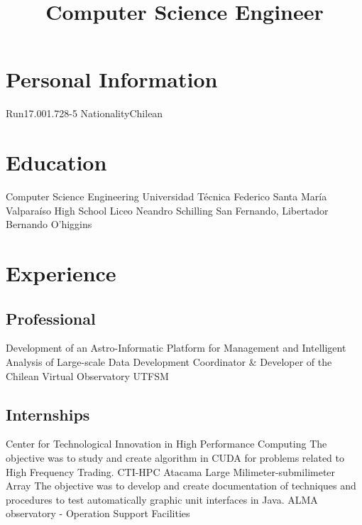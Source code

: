 \documentclass[11pt,a4paper]{moderncv}
\title{Computer Science Engineer}
\begin{document}
\maketitle

\section{Personal Information}
		{Run}{17.001.728-5}
						{Nationality}{Chilean}
							{}{}

\section{Education}
	{Computer Science Engineering}
	{Universidad Técnica Federico Santa María}
	{Valparaíso}
	{}
	{}
	{High School}
	{Liceo Neandro Schilling}
	{San Fernando, Libertador Bernando O'higgins}
	{}{}
\vspace{-0.5cm}

\section{Experience}
\subsection{Professional}
	{Development of an Astro-Informatic Platform for Management and Intelligent Analysis of Large-scale Data}
	{Development Coordinator \& Developer of the Chilean Virtual Observatory}
	{UTFSM}
	{}{}

\subsection{Internships}
	{Center for Technological Innovation in High Performance Computing}
	{The objective was to study and create algorithm in CUDA for problems related to High Frequency Trading.}
	{CTI-HPC}
	{}{}
	{Atacama Large Milimeter-submilimeter Array}
	{The objective was to develop and create documentation of techniques and
	procedures to test automatically graphic unit interfaces in Java.}
	{ALMA observatory - Operation Support Facilities}
	{}{}
\end{document}
